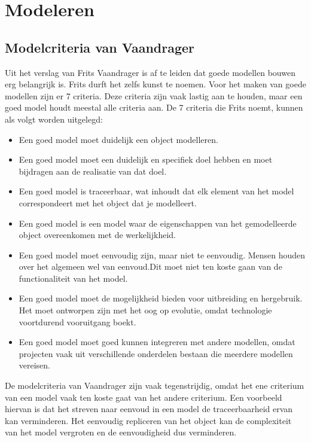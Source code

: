 \documentclass{article} %
\begin{document}
\section{Modeleren}

\subsection{Modelcriteria van Vaandrager}

Uit het verslag van Frits Vaandrager is af te leiden dat goede modellen bouwen erg belangrijk is. Frits durft het zelfs kunst te noemen. Voor het maken van goede modellen zijn er 7 criteria. Deze criteria zijn vaak lastig aan te houden, maar een goed model houdt meestal alle criteria aan. De 7 criteria die Frits noemt, kunnen als volgt worden uitgelegd:
\begin{itemize}
    \item Een goed model moet duidelijk een object modelleren. 
    \item Een goed model moet een duidelijk en specifiek doel hebben en moet bijdragen aan de realisatie van dat doel. 
    \item Een goed model is traceerbaar, wat inhoudt dat elk element van het model correspondeert met het object dat je modelleert. 
    \item Een goed model is een model waar de eigenschappen van het gemodelleerde object overeenkomen met de werkelijkheid. 
    \item Een goed model moet eenvoudig zijn, maar niet te eenvoudig. Mensen houden over het algemeen wel van eenvoud.Dit moet niet ten koste gaan van de functionaliteit van het model. 
    \item Een goed model moet de mogelijkheid bieden voor uitbreiding en hergebruik. Het moet ontworpen zijn met het oog op evolutie, omdat technologie voortdurend vooruitgang boekt.
    \item Een goed model moet goed kunnen integreren met andere modellen, omdat projecten vaak uit verschillende onderdelen bestaan die meerdere modellen vereisen.

\end{itemize}
De modelcriteria van Vaandrager zijn vaak tegenstrijdig, omdat het ene criterium van een model vaak ten koste gaat van het andere criterium. Een voorbeeld hiervan is dat het streven naar eenvoud in een model de traceerbaarheid ervan kan verminderen. Het eenvoudig repliceren van het object kan de complexiteit van het model vergroten en de eenvoudigheid dus verminderen.
\end{document}
